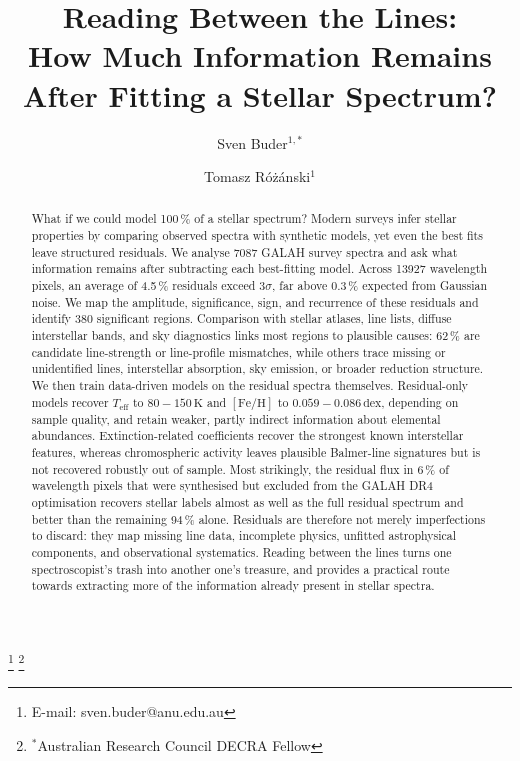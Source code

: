 \documentclass[twocolumn,apj,numberedappendix,appendixfloats]{openjournal}
\begin{document}
\title{Reading Between the Lines:\\How Much Information Remains After Fitting a Stellar Spectrum?}

\author{\vspace{-1.5cm}Sven Buder$^{1,*}$}
\author{Tomasz Różánski$^{1}$}

\thanks{E-mail: sven.buder@anu.edu.au}
\thanks{$^*$Australian Research Council DECRA Fellow}

\begin{abstract} %
What if we could model 100\,\% of a stellar spectrum? Modern surveys infer stellar properties by comparing observed spectra with synthetic models, yet even the best fits leave structured residuals. We analyse 7087 GALAH survey spectra and ask what information remains after subtracting each best-fitting model. Across 13927 wavelength pixels, an average of 4.5\,\% residuals exceed $3\sigma$, far above 0.3\,\% expected from Gaussian noise. We map the amplitude, significance, sign, and recurrence of these residuals and identify 380 significant regions. Comparison with stellar atlases, line lists, diffuse interstellar bands, and sky diagnostics links most regions to plausible causes: 62\,\% are candidate line-strength or line-profile mismatches, while others trace missing or unidentified lines, interstellar absorption, sky emission, or broader reduction structure. We then train data-driven models on the residual spectra themselves. Residual-only models recover $T_\mathrm{eff}$ to $80-150\,\mathrm{K}$ and $[\mathrm{Fe/H}]$ to $0.059-0.086\,\mathrm{dex}$, depending on sample quality, and retain weaker, partly indirect information about elemental abundances. Extinction-related coefficients recover the strongest known interstellar features, whereas chromospheric activity leaves plausible Balmer-line signatures but is not recovered robustly out of sample. Most strikingly, the residual flux in 6\,\% of wavelength pixels that were synthesised but excluded from the GALAH DR4 optimisation recovers stellar labels almost as well as the full residual spectrum and better than the remaining 94\,\% alone. Residuals are therefore not merely imperfections to discard: they map missing line data, incomplete physics, unfitted astrophysical components, and observational systematics. Reading between the lines turns one spectroscopist's trash into another one's treasure, and provides a practical route towards extracting more of the information already present in stellar spectra.
\end{abstract}
\end{document}

